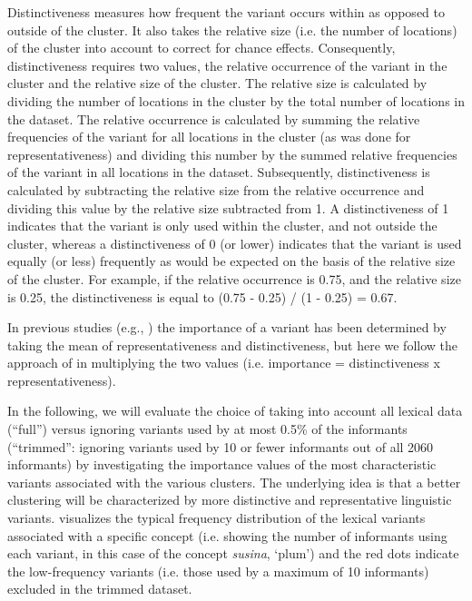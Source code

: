 \documentclass[output=paper]{LSP/langsci}
\begin{document}
Distinctiveness measures how frequent the variant occurs within as opposed to outside of the cluster. It also takes the relative size (i.e. the number of locations) of the cluster into account to correct for chance effects. Consequently, distinctiveness requires two values, the relative occurrence of the variant in the cluster and the relative size of the cluster. The relative size is calculated by dividing the number of locations in the cluster by the total number of locations in the dataset. The relative occurrence is calculated by summing the relative frequencies of the variant for all locations in the cluster (as was done for representativeness) and dividing this number by the summed relative frequencies of the variant in all locations in the dataset. Subsequently, distinctiveness is calculated by subtracting the relative size from the relative occurrence and dividing this value by the relative size subtracted from 1. A distinctiveness of 1 indicates that the variant is only used within the cluster, and not outside the cluster, whereas a distinctiveness of 0 (or lower) indicates that the variant is used equally (or less) frequently as would be expected on the basis of the relative size of the cluster. For example, if the relative occurrence is 0.75, and the relative size is 0.25, the distinctiveness is equal to (0.75 - 0.25) / (1 - 0.25) = 0.67. 

In previous studies (e.g., \citealt{wieling_analyzing_2014}) the importance of a variant has been determined by taking the mean of representativeness and distinctiveness, but here we follow the approach of \citet{montemagni_tracking_2015} in multiplying the two values (i.e. importance = distinctiveness x representativeness).

In the following, we will evaluate the choice of taking into account all lexical data (``full'') versus ignoring variants used by at most 0.5\% of the informants (``trimmed'': ignoring variants used by 10 or fewer informants out of all 2060 informants) by investigating the importance values of the most characteristic variants associated with the various clusters. The underlying idea is that a better clustering will be characterized by more distinctive and representative linguistic variants.  visualizes the typical frequency distribution of the lexical variants associated with a specific concept (i.e. showing the number of informants using each variant, in this case of the concept \textit{susina}, `plum') and the red dots indicate the low-frequency variants (i.e. those used by a maximum of 10 informants) excluded in the trimmed dataset.
\end{document}
